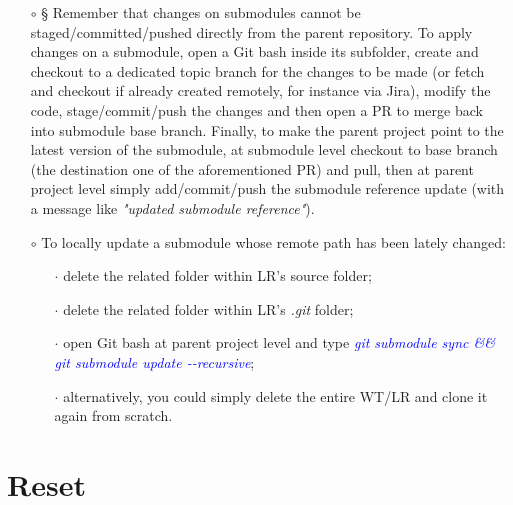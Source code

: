 \documentclass[a4paper,portrait,10pt]{article}   %
\newcommand{\mybulletlvA}{$\circ$}   %
\newcommand{\mybulletlvB}{$\cdot$}   %
\newcommand{\mycmd}[1]{\textcolor{blue}{\textit{#1}}}   %
\newcommand{\myvspace}{\vspace{4mm}}   %
\begin{document}
\begin{itemize}
\item[\mybulletlvA] § Remember that changes on submodules cannot be staged/committed/pushed directly from the parent repository. To apply changes on a submodule, open a Git bash inside its subfolder, create and checkout to a dedicated topic branch for the changes to be made (or fetch and checkout if already created remotely, for instance via Jira), modify the code, stage/commit/push the changes and then open a PR to merge back into submodule base branch. Finally, to make the parent project point to the latest version of the submodule, at submodule level checkout to base branch (the destination one of the aforementioned PR) and pull, then at parent project level simply add/commit/push the submodule reference update (with a message like \textit{"updated submodule reference"}).
\myvspace

\item[\mybulletlvA] To locally update a submodule whose remote path has been lately changed:
\begin{itemize}
  \item[\mybulletlvB] delete the related folder within LR's source folder;
  \item[\mybulletlvB] delete the related folder within LR's \textit{.git} folder;
  \item[\mybulletlvB] open Git bash at parent project level and type \mycmd{git submodule sync \&\& git submodule update -{}-recursive};
  \item[\mybulletlvB] alternatively, you could simply delete the entire WT/LR and clone it again from scratch.
\end{itemize}
\end{itemize}
\myvspace


\section{Reset}   \label{sec:Reset}
\end{document}
